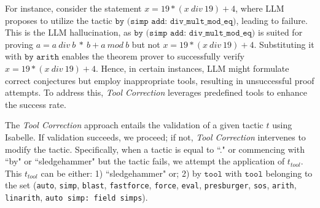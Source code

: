 \documentclass{article} \usepackage{iclr2024_conference,times}
\def\methodOneFull{\textit{Tool Correction}\xspace}
\begin{document}
For instance, consider the statement $x=19*(x~div~19)+4$, where LLM proposes to utilize the tactic $\texttt{by\ (simp\ add:\ div\_mult\_mod\_eq)}$, leading to failure. This is the LLM hallucination, as $\texttt{by\ (simp\ add:\ div\_mult\_mod\_eq)}$ is suited for proving $a=a~div~b~*~b + a~mod~b$ but not $x=19*(x~div~19)+4$. Substituting it with $\texttt{by~arith}$ enables the theorem prover to successfully verify $x=19*(x~div~19)+4$. Hence, in certain instances, LLM might formulate correct conjectures but employ inappropriate tools, resulting in unsuccessful proof attempts. To address this, \methodOneFull leverages predefined tools to enhance the success rate.

The \methodOneFull approach entails the validation of a given tactic $t$ using Isabelle. If validation succeeds, we proceed; if not, \methodOneFull intervenes to modify the tactic. Specifically, when a tactic is equal to ``." or commencing with ``by" or ``sledgehammer" but the tactic fails, we attempt the application of $t_{tool}$. This $t_{tool}$ can be either: 1) ``sledgehammer" or; 2) by $\texttt{tool}$ with $\texttt{tool}$ belonging to the set {(\texttt{auto}, \texttt{simp}, \texttt{blast}, \texttt{fastforce}, \texttt{force}, \texttt{eval}, \texttt{presburger}, \texttt{sos}, \texttt{arith}, \texttt{linarith}, \texttt{auto simp: field simps})}.
\end{document}
